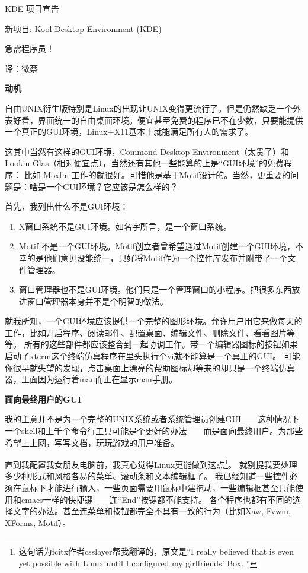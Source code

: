 \begin{insertnote}


\begin{center}
KDE 项目宣告

新项目: Kool Desktop Environment (KDE)

{\scriptsize 急需程序员！}

{\footnotesize 译：微蔡}
\end{center}

{\large  \noindent \bf 动机}

自由UNIX衍生版特别是Linux的出现让UNIX变得更流行了。但是仍然缺乏一个外表好看，界面统一的自由桌面环境。便宜甚至免费的程序已不在少数，只要能提供一个真正的GUI环境，Linux+X11基本上就能满足所有人的需求了。

这其中当然有这样的GUI环境，Commond Desktop Environment（太贵了）和Lookin Glas（相对便宜点），当然还有其他一些能算的上是“GUI环境”的免费程序：
比如 Moxfm 工作的就很好。可惜他是基于Motif设计的。当然，更重要的问题是：啥是一个GUI环境？它应该是怎么样的？


首先，我列出什么不是GUI环境：

\begin{enumerate}
\item [\textbullet] X窗口系统不是GUI环境。如名字所言，是一个窗口系统。
\item [\textbullet] Motif 不是一个GUI环境。Motif创立者曾希望通过Motif创建一个GUI环境，不幸的是他们意见没能统一，只好将Motif作为一个控件库发布并附带了一个文件管理器。

\item [\textbullet] 窗口管理器也不是GUI环境。他们只是一个管理窗口的小程序。把很多东西放进窗口管理器本身并不是个明智的做法。
\end{enumerate}

就我所知，一个GUI环境应该提供一个完整的图形环境。允许用户用它来做每天的工作，比如开启程序、阅读邮件、配置桌面、编辑文件、删除文件、看看图片等等。
所有的这些部件都应该整合到一起协调工作。带一个编辑器图标的按钮如果启动了xterm这个终端仿真程序在里头执行个vi就不能算是一个真正的GUI。
可能你很早就失望的发现，点击桌面上漂亮的帮助图标却等来的却只是一个终端仿真器，里面因为运行着man而正在显示man手册。

{\large \noindent \bf 面向最终用户的GUI}

我的主意并不是为一个完整的UNIX系统或者系统管理员创建GUI——这种情况下一个shell和上千个命令行工具可能是个更好的办法——而是面向最终用户。为那些希望上上网，写写文档，玩玩游戏的用户准备。

直到我配置我女朋友电脑前，我真心觉得Linux更能做到这点\footnote{这句话为fcitx作者csslayer帮我翻译的，原文是“I really believed that is even yet possible with Linux until I configured my girlfriends' Box. ”}。
就别提我要处理多少种形式和风格各易的菜单、滚动条和文本编辑框了。
我已经知道一些控件必须在鼠标下才能进行输入，一些页面需要用鼠标中建拖动，一些编辑框甚至只能使用和emacs一样的快捷键——连“End”按键都不能支持。
各个程序也都有不同的选择文字的办法。甚至连菜单和按钮都完全不具有一致的行为（比如Xaw, Fvwm, XForms, Motif）。


\end{insertnote}
